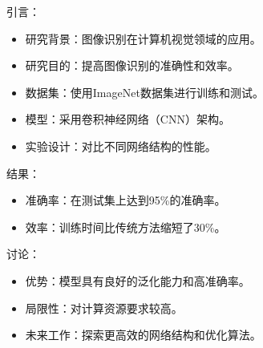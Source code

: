 \begin{gptbox}
\footnotesize{
引言：
    \begin{itemize}
        \item {研究背景：图像识别在计算机视觉领域的应用。}
        \item {研究目的：提高图像识别的准确性和效率。}
    \end{itemize}
    
    \begin{itemize}
        \item {数据集：使用ImageNet数据集进行训练和测试。}
        \item {模型：采用卷积神经网络（CNN）架构。}
        \item {实验设计：对比不同网络结构的性能。}
    \end{itemize}
结果：
    \begin{itemize}
        \item {准确率：在测试集上达到95\%的准确率。}
        \item {效率：训练时间比传统方法缩短了30\%。}
    \end{itemize}
讨论：
    \begin{itemize}
        \item {优势：模型具有良好的泛化能力和高准确率。}
        \item {局限性：对计算资源要求较高。}
        \item {未来工作：探索更高效的网络结构和优化算法。}
    \end{itemize}
}
\end{gptbox}

